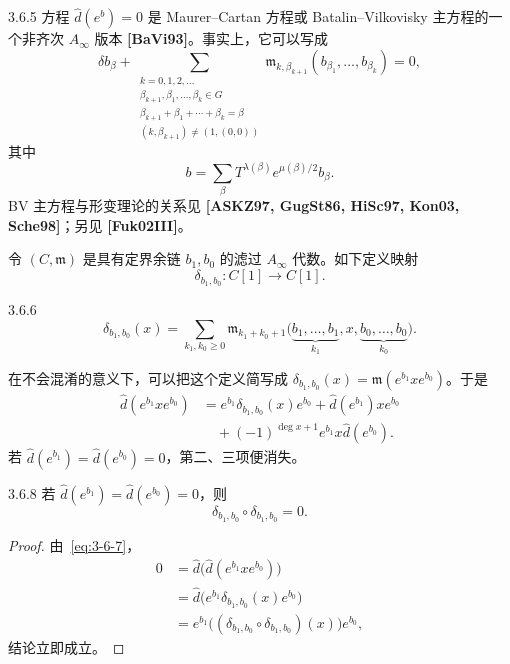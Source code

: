 \begin{remark}{3.6.5}\label{rem:3-6-5}
方程 $\widehat d(e^b)=0$ 是 Maurer--Cartan 方程或
Batalin--Vilkovisky 主方程的一个非齐次 $A_\infty$ 版本
\textbf{[BaVi93]}。事实上，它可以写成
\[
  \delta b_\beta+
  \sum_{\substack{k=0,1,2,\ldots\\
       \beta_{k+1},\beta_1,\ldots,\beta_k\in G\\
       \beta_{k+1}+\beta_1+\cdots+\beta_k=\beta\\
       (k,\beta_{k+1})\ne(1,(0,0))}}
  \mathfrak m_{k,\beta_{k+1}}
  (b_{\beta_1},\ldots,b_{\beta_k})=0,
\]
其中
\[
  b=\sum_\beta T^{\lambda(\beta)}e^{\mu(\beta)/2}b_\beta.
\]
BV 主方程与形变理论的关系见
\textbf{[ASKZ97, GugSt86, HiSc97, Kon03, Sche98]}；另见
\textbf{[Fuk02III]}。
\end{remark}

令 $(C,\mathfrak m)$ 是具有定界余链 $b_1,b_0$ 的滤过
$A_\infty$ 代数。如下定义映射
\[
  \delta_{b_1,b_0}\colon C[1]\longrightarrow C[1].
\]

\begin{definition}{3.6.6}\label{def:3-6-6}
\[
  \delta_{b_1,b_0}(x)
  =\sum_{k_1,k_0\geq0}
  \mathfrak m_{k_1+k_0+1}
  \bigl(
    \underbrace{b_1,\ldots,b_1}_{k_1},x,
    \underbrace{b_0,\ldots,b_0}_{k_0}
  \bigr).
\]
\end{definition}

在不会混淆的意义下，可以把这个定义简写成
$\delta_{b_1,b_0}(x)=\mathfrak m(e^{b_1}xe^{b_0})$。\mbox{于是}
\begin{equation}
\begin{aligned}
  \widehat d(e^{b_1}xe^{b_0})
  &={}e^{b_1}\delta_{b_1,b_0}(x)e^{b_0}
    +\widehat d(e^{b_1})xe^{b_0}\\
  &\quad{}+(-1)^{\deg x+1}e^{b_1}x\widehat d(e^{b_0}).
\end{aligned}
\tag{3.6.7}\label{eq:3-6-7}
\end{equation}
若 $\widehat d(e^{b_1})=\widehat d(e^{b_0})=0$，第二、三项便消失。

\begin{lemma}{3.6.8}\label{lem:3-6-8}
若 $\widehat d(e^{b_1})=\widehat d(e^{b_0})=0$，则
\[
  \delta_{b_1,b_0}\circ\delta_{b_1,b_0}=0.
\]
\end{lemma}

\begin{proof}
由~\eqref{eq:3-6-7}，
\[
\begin{aligned}
0
&=\widehat d\bigl(\widehat d(e^{b_1}xe^{b_0})\bigr)\\
&=\widehat d\bigl(e^{b_1}\delta_{b_1,b_0}(x)e^{b_0}\bigr)\\
&=e^{b_1}
  \bigl((\delta_{b_1,b_0}\circ\delta_{b_1,b_0})(x)\bigr)e^{b_0},
\end{aligned}
\]
结论立即成立。
\end{proof}

